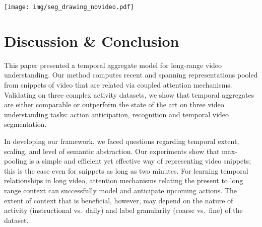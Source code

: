 \documentclass[runningheads]{llncs}
\begin{document}
 
 \begin{table}[t]
\centering 
\begin{minipage}[b]{0.45\linewidth}
\centering
{} 
\end{minipage} 
\begin{minipage}[b]{0.5\linewidth}
\centering
\texttt{[image: img/seg\_drawing\_novideo.pdf]}\\
\end{minipage} 
\caption{Exemplary segmentation and comparisons on Breakfast. }
\label{video_segmentation}
\end{table}

\section{Discussion \& Conclusion}

This paper presented a temporal aggregate model for long-range video understanding. Our method computes recent and spanning representations pooled from snippets of video that are related via coupled attention mechanisms. Validating on three complex activity datasets, we show that temporal aggregates are either comparable or outperform the state of the art on three video understanding tasks: action anticipation, recognition and temporal video segmentation.

In developing our framework, we faced questions regarding temporal extent, scaling, and level of semantic abstraction.  Our experiments show that max-pooling is a simple and efficient yet effective way of representing video snippets; this is the case even for snippets as long as two minutes. For learning temporal relationships in long video, attention mechanisms relating the present to long range context can successfully model and anticipate upcoming actions. The extent of context that is beneficial, however, may depend on the nature of activity (instructional vs.~daily) and label granularity (coarse vs.~fine) of the dataset.
\end{document}
